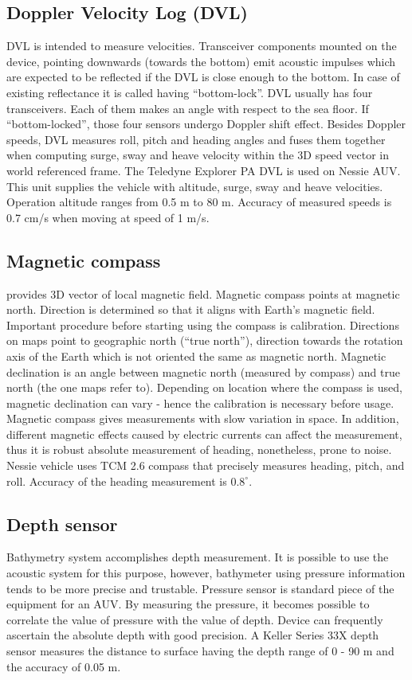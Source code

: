 \subsection{Doppler Velocity Log (DVL)}
DVL is intended to measure  velocities. Transceiver components mounted on the device, pointing downwards (towards the bottom) emit acoustic impulses which are expected to be reflected if the DVL is close enough to the bottom. In case of existing reflectance it is called having ``bottom-lock''. DVL usually has four transceivers. Each of them makes an angle with respect to the sea floor. If ``bottom-locked'', those four sensors undergo Doppler shift effect. Besides Doppler speeds, DVL measures roll, pitch and heading angles and fuses them together when computing surge, sway and heave velocity within the 3D speed vector in world referenced frame. The Teledyne Explorer PA DVL is used on Nessie AUV. This unit supplies the vehicle with altitude, surge, sway and heave velocities. Operation altitude ranges from 0.5 m to 80 m. Accuracy of measured speeds is 0.7 cm/s when moving at speed of 1 m/s.

\subsection{Magnetic compass} 
provides 3D vector of local magnetic field. Magnetic compass points at magnetic north. Direction is determined so that it aligns with Earth's magnetic field. Important procedure before starting using the compass is calibration. Directions on maps point to geographic north (``true north''), direction towards the rotation axis of the Earth which is not oriented the same as magnetic north. Magnetic declination is an angle between magnetic north (measured by compass) and true north (the one maps refer to). Depending on location where the compass is used, magnetic declination can vary - hence the calibration is necessary before usage. Magnetic compass gives measurements with slow variation in space. In addition, different magnetic effects caused by electric currents can affect the measurement, thus it is robust absolute measurement of heading, nonetheless, prone to noise. Nessie vehicle uses TCM 2.6 compass that precisely measures heading, pitch, and roll. Accuracy of the heading measurement is $0.8^{\circ}$.
\subsection{Depth sensor} 
Bathymetry system accomplishes depth measurement. It is possible to use the acoustic system for this purpose, however, bathymeter using pressure information tends to be more precise and trustable. Pressure sensor is standard piece of the equipment for an AUV. By measuring the pressure, it becomes possible to correlate the value of pressure with the value of depth. Device can frequently ascertain the absolute depth with good precision. A Keller Series 33X depth sensor measures the distance to surface having the depth range of 0 - 90 m and the accuracy of 0.05 m. 
